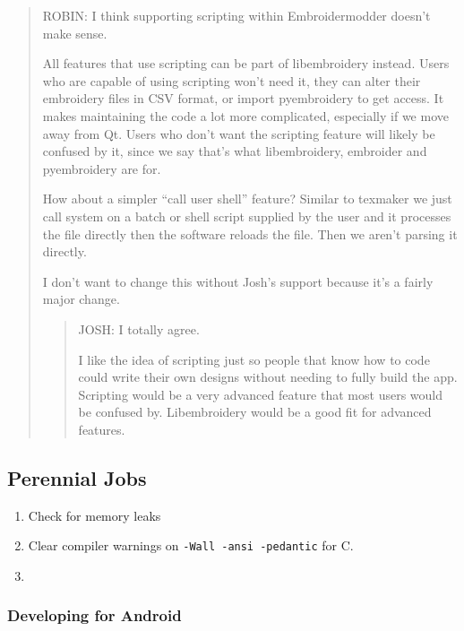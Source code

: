 \documentclass[a4paper, 11pt]{report}
\begin{document}
\begin{quote}
ROBIN: I think supporting scripting within Embroidermodder doesn't make
sense.

All features that use scripting can be part of libembroidery instead.
Users who are capable of using scripting won't need it, they can alter
their embroidery files in CSV format, or import pyembroidery to get
access. It makes maintaining the code a lot more complicated, especially
if we move away from Qt. Users who don't want the scripting feature will
likely be confused by it, since we say that's what libembroidery,
embroider and pyembroidery are for.

How about a simpler ``call user shell'' feature? Similar to texmaker we
just call system on a batch or shell script supplied by the user and it
processes the file directly then the software reloads the file. Then we
aren't parsing it directly.

I don't want to change this without Josh's support because it's a fairly
major change.

\begin{quote}
JOSH: I totally agree.

I like the idea of scripting just so people that know how to code could
write their own designs without needing to fully build the app.
Scripting would be a very advanced feature that most users would be
confused by. Libembroidery would be a good fit for advanced features.
\end{quote}
\end{quote}

\hypertarget{perennial-jobs-1}{%
\subsection{Perennial Jobs}\label{perennial-jobs-1}}

\begin{enumerate}
\def\labelenumi{\arabic{enumi}.}
\item
  Check for memory leaks
\item
  Clear compiler warnings on \texttt{-Wall\ -ansi\ -pedantic} for C.
\item
\end{enumerate}

\hypertarget{developing-for-android-1}{%
\subsubsection{Developing for Android}\label{developing-for-android-1}}
\end{document}
